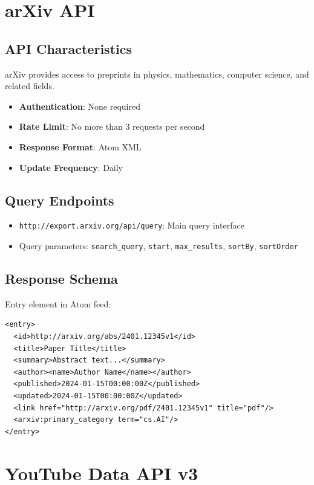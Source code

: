 \documentclass[12pt,a4paper]{report}
\begin{document}
\section{arXiv API}

\subsection{API Characteristics}

arXiv provides access to preprints in physics, mathematics, computer science, and related fields.

\begin{itemize}
    \item \textbf{Authentication}: None required
    \item \textbf{Rate Limit}: No more than 3 requests per second
    \item \textbf{Response Format}: Atom XML
    \item \textbf{Update Frequency}: Daily
\end{itemize}

\subsection{Query Endpoints}

\begin{itemize}
    \item \texttt{http://export.arxiv.org/api/query}: Main query interface
    \item Query parameters: \texttt{search\_query}, \texttt{start}, \texttt{max\_results}, \texttt{sortBy}, \texttt{sortOrder}
\end{itemize}

\subsection{Response Schema}

Entry element in Atom feed:

\begin{lstlisting}
<entry>
  <id>http://arxiv.org/abs/2401.12345v1</id>
  <title>Paper Title</title>
  <summary>Abstract text...</summary>
  <author><name>Author Name</name></author>
  <published>2024-01-15T00:00:00Z</published>
  <updated>2024-01-15T00:00:00Z</updated>
  <link href="http://arxiv.org/pdf/2401.12345v1" title="pdf"/>
  <arxiv:primary_category term="cs.AI"/>
</entry>
\end{lstlisting}

\section{YouTube Data API v3}
\end{document}
